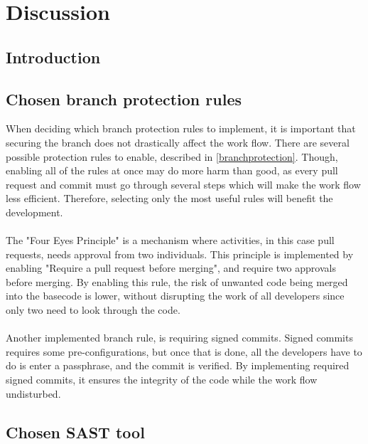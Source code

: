 \chapter{Discussion}
\section{Introduction}

\section{Chosen branch protection rules}
When deciding which branch protection rules to implement, it is important that securing the branch does not drastically affect the work flow. There are several possible protection rules to enable, described in \ref{branchprotection}. Though, enabling all of the rules at once may do more harm than good, as every pull request and commit must go through several steps which will make the work flow less efficient. Therefore, selecting only the most useful rules will benefit the development. 
\\~\\
The "Four Eyes Principle" is a mechanism where activities, in this case pull requests, needs approval from two individuals.  This principle is implemented by enabling "Require a pull request before merging", and require two approvals before merging. By enabling this rule, the risk of unwanted code being merged into the basecode is lower, without disrupting the work of all developers since only two need to look through the code. \cite{foureyes}
\\~\\
Another implemented branch rule, is requiring signed commits. Signed commits requires some pre-configurations, but once that is done, all the developers have to do is enter a passphrase, and the commit is verified. By implementing required signed commits, it ensures the integrity of the code while the work flow undisturbed.

\section{Chosen SAST tool}